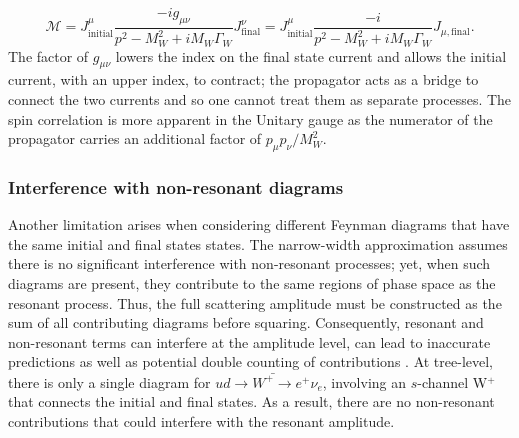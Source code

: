 \documentclass[a4paper,11pt]{article}
\begin{document}
$$
\mathcal{M} = J^\mu_{\text{initial}}\frac{-ig_{\mu\nu}}{p^2 - M_W^2 +iM_W\Gamma_W} J^\nu_{\text{final}} = J^\mu_{\text{initial}} \frac{-i}{p^2 - M_W^2 +iM_W\Gamma_W}J_{\mu, \text{final}}.
$$
The factor of $g_{\mu\nu}$ lowers the index on the final state current and allows the initial current, with an upper index, to contract; the propagator acts as a bridge to connect the two currents and so one cannot treat them as separate processes. The spin correlation is more apparent in the Unitary gauge as the numerator of the propagator carries an additional factor of $p_\mu p_\nu/M_W^2$.\\

 \subsubsection{Interference with non-resonant diagrams}
Another limitation arises when considering different Feynman diagrams that have the same initial and final states states. The narrow-width approximation assumes there is no significant interference with non-resonant processes\cite{Berdine:2007uv}; yet, when such diagrams are present, they contribute to the same regions of phase space as the resonant process. Thus, the full scattering amplitude must be constructed as the sum of all contributing diagrams before squaring. Consequently, resonant and non-resonant terms can interfere at the amplitude level, can lead to inaccurate predictions as well as potential double counting of contributions \cite{Kauer:2001sp}. At tree-level, there is only a single diagram for $u\bar{d \rightarrow W^+ \rightarrow e^+ \nu_e}$, involving an $s$-channel W$^+$ that connects the initial and final states. As a result, there are no non-resonant contributions that could interfere with the resonant amplitude.
\end{document}
